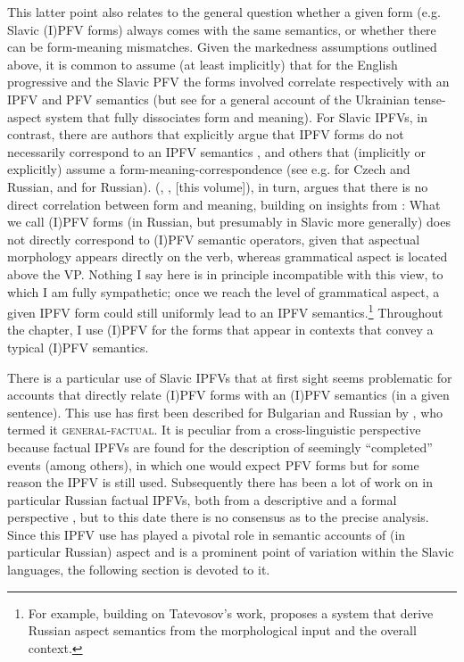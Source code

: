 \documentclass[output=paper,colorlinks,citecolor=brown]{langscibook}
\begin{document}
This latter point also relates to the general question whether a given form (e.g. Slavic (I)PFV forms) always comes with the same semantics, or whether there can be form-meaning mismatches. Given the markedness assumptions outlined above, it is common to assume (at least implicitly) that for the English progressive and the Slavic PFV the forms involved correlate respectively with an IPFV and PFV semantics (but see \citealt{paslawskastechukr} for a general account of the Ukrainian tense-aspect system that fully dissociates form and meaning). For Slavic IPFVs, in contrast, there are authors that explicitly argue that IPFV forms do not necessarily correspond to an IPFV semantics \citep[for Russian, see][]{%
Borik2006,%
gronndiss,gronn15}, and others that (implicitly or explicitly) assume a form-meaning-correspondence (see e.g. \citealt{Filip1999,gehrke22,gehrketrueipf} for Czech and Russian, and \citealt{altshuler14} for Russian). %
\citeauthor{Tatevosov2011} (\citeyear{Tatevosov2011}, \citeyear{Tatevosov2015b}, \citeyear{chapters/11_tatevosov} [this volume]), in turn, argues that there is no direct correlation between form and meaning, building on insights from \citet{Klein1994,Klein1995}: What we call (I)PFV forms (in Russian, but presumably in Slavic more generally) does not directly correspond to (I)PFV semantic operators, given that aspectual morphology appears directly on the verb, whereas grammatical aspect is located above the VP. Nothing I say here is in principle incompatible with this view, to which I am fully sympathetic; once we reach the level of grammatical aspect, a given IPFV form could still uniformly lead to an IPFV semantics.\footnote{For example, building on Tatevosov's work,  proposes a system that derive Russian aspect semantics from the morphological input and the overall context.} Throughout the chapter, I use (I)PFV for the forms that appear in contexts that convey a typical (I)PFV semantics. 

There is a particular use of Slavic IPFVs that at first sight seems problematic for accounts that directly relate (I)PFV forms with an (I)PFV semantics (in a given sentence). This use has first been described for Bulgarian and Russian by \citet{maslov59}, who termed it \textsc{general-factual}. It is peculiar from a cross-linguistic perspective because factual IPFVs are found for the description of seemingly ``completed'' events (among others), in which one would expect PFV forms but for some reason the IPFV is still used. Subsequently there has been a lot of work on in particular Russian factual IPFVs, both from a descriptive and a formal perspective \citep[e.g.][]{glovinskaja81,glovinskaja89,paduceva96,mehlig01,mehlig13,gronndiss,gronn15,muellerhab,gehrketrueipf}, but to this date there is no consensus as to the precise analysis. Since this IPFV use has played a pivotal role in semantic accounts of (in particular Russian) aspect and is a prominent point of variation within the Slavic languages, the following section is devoted to it.
\end{document}
